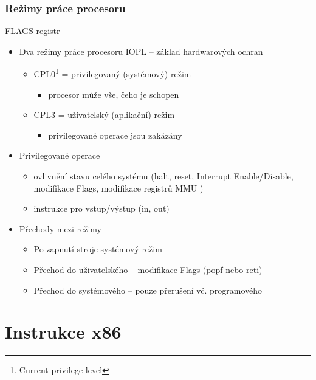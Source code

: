 \documentclass{beamer}
\begin{document}
\begin{frame}
\frametitle{Režimy práce procesoru}
FLAGS registr 
\begin{itemize}
  \item Dva režimy práce procesoru IOPL -- základ hardwarových ochran
  \begin{itemize}
    \item CPL0\footnote{Current privilege level} = privilegovaný (systémový) režim
    \begin{itemize}
      \item procesor může vše, čeho je schopen
    \end{itemize}
    \item CPL3 = uživatelský (aplikační) režim
    \begin{itemize}
      \item privilegované operace  jsou zakázány
    \end{itemize}
  \end{itemize}
  \item Privilegované operace
  \begin{itemize}
    \item ovlivnění stavu celého systému (halt, reset, Interrupt Enable/Disable, modifikace Flags,  modifikace registrů MMU ) 
    \item instrukce pro vstup/výstup (in, out)
  \end{itemize}

  \item Přechody mezi režimy
  \begin{itemize}
    \item Po zapnutí stroje systémový režim
    \item Přechod do uživatelského – modifikace Flags (popf nebo reti)
    \item Přechod do systémového – pouze přerušení vč. programového
  \end{itemize}
\end{itemize}
\end{frame}


\section{Instrukce x86}
\end{document}
